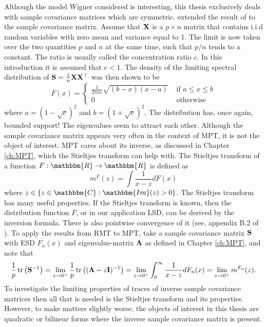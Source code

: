 \documentclass[12pt, oneside]{book}\usepackage{knitr}
\begin{document}
{Although the model Wigner considered is interesting, this thesis exclusively deals with sample covariance matrices which are symmetric.
\citet{marchenko1967distribution} extended the result of \citet{wigner1967random} to the sample covariance matrix.
Assume that $\mathbf{X}$ is a $p \times n$ matrix that contains i.i.d random variables with zero mean and variance equal to $1$.
The limit is now taken over the two quantities $p$ and $n$ at the same time, such that $p/n$ tends to a constant.
The ratio is usually called the concentration ratio $c$.
In this introduction it is assumed that $c<1$.
The density of the limiting spectral distribution of $\mathbf{S}=\frac{1}{n} \mathbf{X} \mathbf{X}^\top$ was then shown to be
$$
F(x) = \begin{cases}
\frac{1}{2\pi x c} \sqrt{(b-x)(x-a)} & \text{ if } a \leq x \leq b\\
0 & \text{ otherwise}
\end{cases}
$$
where $a=(1-\sqrt{c})^2$ and $b=(1+\sqrt{c})^2$. 
The distribution has, once again, bounded support! 
The eigenvalues seem to attract each other. 
Although the sample covariance matrix appears very often in the context of MPT, it is not the object of interest. 
MPT cares about its inverse, as discussed in Chapter \ref{ch:MPT}, which the Stieltjes transform can help with. 
The Stieltjes transform of a function $F: \mathbbm{R} \rightarrow \mathbbm{R}$ is defined as 
\begin{equation}\label{eqn:stieltjes}
m^F(z) = \int \frac{1}{x-z}dF(x)
\end{equation}
where $z \in \{z \in \mathbbm{C}: \mathbbm{Im}(z)>0 \}$. 
The Stieltjes transform has many useful properties. 
If the Stieltjes transform is known, then the distribution function $F$, or in our application LSD, can be derived by the inversion formula. 
There is also pointwise convergence of it (see, appendix B.2 of \citet{bai2010spectral}). 
To apply the results from RMT to MPT, take a sample covariance matrix $\mathbf{S}$ with ESD $F_n(x)$ and eigenvalue-matrix $\boldsymbol{\Lambda}$ as defined in Chapter \ref{ch:MPT}, and note that
\begin{equation}
\frac{1}{p}\operatorname{tr} \left( \mathbf{S}^{-1} \right) = \lim_{z\rightarrow 0^+} \frac{1}{p} \operatorname{tr} \left( (\boldsymbol{\Lambda} -z\mathbf{I})^{-1} \right) = \lim_{z\rightarrow 0^+} \int_0^\infty \frac{1}{x - z} dF_n(x) = \lim_{z\rightarrow 0^+} m^{F_n}(z).
\end{equation}
To investigate the limiting properties of traces of inverse sample covariance matrices then all that is needed is the Stieltjes transform and its properties. 
However, to make matters slightly worse, the objects of interest in this thesis are quadratic or bilinear forms where the inverse sample covariance matrix is present. 
}
\end{document}
